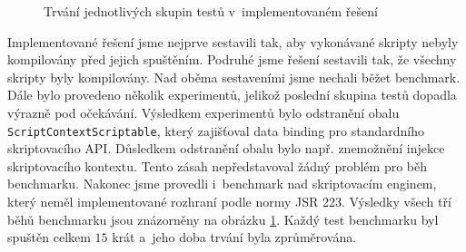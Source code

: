 \begin{figure}[H]
  \begin{center}
    \caption{Trvání jednotlivých skupin testů v~implementovaném řešení}
    \label{Figure.ScriptBoxComparison}
  \end{center}
\end{figure}

\vspace{-1em}

Implementované řešení jsme nejprve sestavili tak, aby vykonávané skripty nebyly kompilovány před jejich spuštěním. Podruhé jsme řešení sestavili tak, že všechny skripty byly kompilovány. Nad oběma sestaveními jsme nechali běžet benchmark. Dále bylo provedeno několik experimentů, jelikož poslední skupina testů dopadla výrazně pod očekávání. Výsledkem experimentů bylo odstranění obalu \texttt{ScriptContextScriptable}, který zajišťoval data binding pro standardního skriptovacího API. Důsledkem odstranění obalu bylo např. znemožnění injekce skriptovacího kontextu. Tento zásah nepředstavoval žádný problém pro běh benchmarku. Nakonec jsme provedli i~benchmark nad skriptovacím enginem, který neměl implementované rozhraní podle normy JSR 223. Výsledky všech tří běhů benchmarku jsou znázorněny na obrázku \ref{Figure.ScriptBoxComparison}. Každý test benchmarku byl spuštěn celkem $15$ krát a~jeho doba trvání byla zprůměrována.

